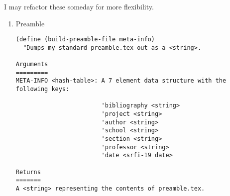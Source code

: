 \documentclass[11pt]{article}
\begin{document}
I may refactor these someday for more flexibility.
\begin{enumerate}
\item Preamble
\label{sec:org289f9ff}
\begin{verbatim}
(define (build-preamble-file meta-info)
  "Dumps my standard preamble.tex out as a <string>.

Arguments
=========
META-INFO <hash-table>: A 7 element data structure with the following keys:

                        'bibliography <string>
                        'project <string>
                        'author <string>
                        'school <string>
                        'section <string>
                        'professor <string>
                        'date <srfi-19 date>

Returns
=======
A <string> representing the contents of preamble.tex.


\end{verbatim}
\end{enumerate}
\end{document}

